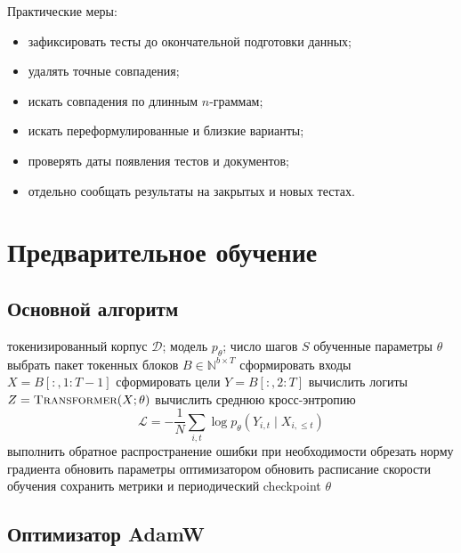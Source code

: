 \documentclass[12pt,a4paper]{article}
\newcommand{\D}{\mathcal{D}}
\newcommand{\1}{\mathbf{1}}
\theoremstyle{definition}
\theoremstyle{remark}
\begin{document}
Практические меры:

\begin{itemize}
    \item зафиксировать тесты до окончательной подготовки данных;
    \item удалять точные совпадения;
    \item искать совпадения по длинным $n$-граммам;
    \item искать переформулированные и близкие варианты;
    \item проверять даты появления тестов и документов;
    \item отдельно сообщать результаты на закрытых и новых тестах.
\end{itemize}

\section{Предварительное обучение}

\subsection{Основной алгоритм}

\begin{algorithm}[h]
\caption{Предварительное обучение авторегрессионной LLM}
\begin{algorithmic}[1]
\Require токенизированный корпус $\D$; модель $p_\theta$;
число шагов $S$
\Ensure обученные параметры $\theta$
    \State выбрать пакет токенных блоков $B\in\mathbb{N}^{b\times T}$
    \State сформировать входы $X=B[:,1:T-1]$
    \State сформировать цели $Y=B[:,2:T]$
    \State вычислить логиты $Z=\Call{Transformer}{X;\theta}$
    \State вычислить среднюю кросс-энтропию
    \[
    \mathcal{L}
    =
    -\frac{1}{N}
    \sum_{i,t}
    \log p_\theta(Y_{i,t}\mid X_{i,\leq t})
    \]
    \State выполнить обратное распространение ошибки
    \State при необходимости обрезать норму градиента
    \State обновить параметры оптимизатором
    \State обновить расписание скорости обучения
    \State сохранить метрики и периодический checkpoint
\EndFor
\State \Return $\theta$
\end{algorithmic}
\end{algorithm}

\subsection{Оптимизатор AdamW}
\end{document}
